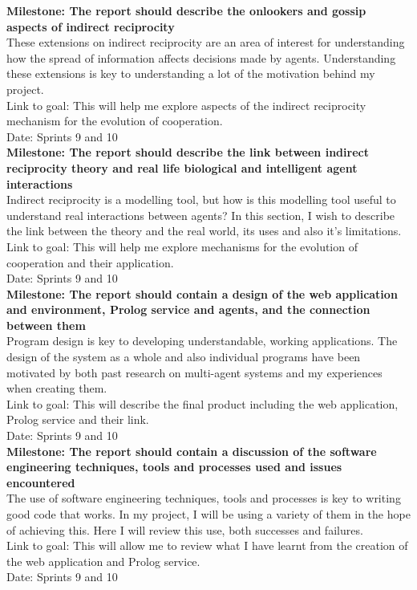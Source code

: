 \documentclass{article}
\begin{document}
\noindent\textbf{Milestone: The report should describe the onlookers and gossip aspects of indirect reciprocity}\\
These extensions on indirect reciprocity are an area of interest for understanding how the spread of information affects decisions made by agents. Understanding these extensions is key to understanding a lot of the motivation behind my project.\\
Link to goal: This will help me explore aspects of the indirect reciprocity mechanism for the evolution of cooperation.\\
Date: Sprints 9 and 10\\

\noindent\textbf{Milestone: The report should describe the link between indirect reciprocity theory and real life biological and intelligent agent interactions}\\
Indirect reciprocity is a modelling tool, but how is this modelling tool useful to understand real interactions between agents? In this section, I wish to describe the link between the theory and the real world, its uses and also it's limitations.\\
Link to goal: This will help me explore mechanisms for the evolution of cooperation and their application.\\
Date: Sprints 9 and 10\\

\noindent\textbf{Milestone: The report should contain a design of the web application and environment, Prolog service and agents, and the connection between them}\\
Program design is key to developing understandable, working applications. The design of the system as a whole and also individual programs have been motivated by both past research on multi-agent systems and my experiences when creating them.\\
Link to goal: This will describe the final product including the web application, Prolog service and their link.\\
Date: Sprints 9 and 10\\

\noindent\textbf{Milestone: The report should contain a discussion of the software engineering techniques, tools and processes used and issues encountered}\\
The use of software engineering techniques, tools and processes is key to writing good code that works. In my project, I will be using a variety of them in the hope of achieving this. Here I will review this use, both successes and failures.\\
Link to goal: This will allow me to review what I have learnt from the creation of the web application and Prolog service.\\
Date: Sprints 9 and 10\\
\end{document}

